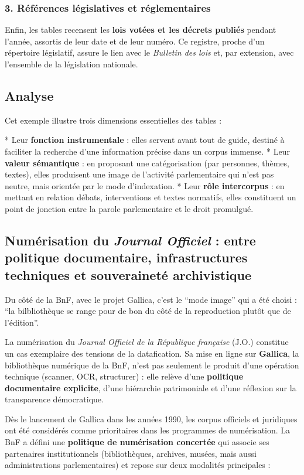 \subsubsection{3. Références législatives et réglementaires}

Enfin, les tables recensent les \textbf{lois votées et les décrets publiés} pendant l’année, assortis de leur date et de leur numéro. Ce registre, proche d’un répertoire législatif, assure le lien avec le \emph{Bulletin des lois} et, par extension, avec l’ensemble de la législation nationale.

\subsection{Analyse}

Cet exemple illustre trois dimensions essentielles des tables :

* Leur \textbf{fonction instrumentale} : elles servent avant tout de guide, destiné à faciliter la recherche d’une information précise dans un corpus immense.
* Leur \textbf{valeur sémantique} : en proposant une catégorisation (par personnes, thèmes, textes), elles produisent une image de l’activité parlementaire qui n’est pas neutre, mais orientée par le mode d’indexation.
* Leur \textbf{rôle intercorpus} : en mettant en relation débats, interventions et textes normatifs, elles constituent un point de jonction entre la parole parlementaire et le droit promulgué.

\subsection{Numérisation du \emph{Journal Officiel} : entre politique documentaire, infrastructures techniques et souveraineté archivistique}

Du côté de la BnF, avec le projet Gallica, c'est le \enquote{mode image} qui a été choisi : \enquote{la bilbliothèque se range pour de bon du côté de la reproduction plutôt que de l'édition}.

La numérisation du \emph{Journal Officiel de la République française} (J.O.) constitue un cas exemplaire des tensions de la datafication. Sa mise en ligne sur \textbf{Gallica}, la bibliothèque numérique de la BnF, n’est pas seulement le produit d’une opération technique (scanner, OCR, structurer) : elle relève d’une \textbf{politique documentaire explicite}, d’une hiérarchie patrimoniale et d’une réflexion sur la transparence démocratique.

Dès le lancement de Gallica dans les années 1990, les corpus officiels et juridiques ont été considérés comme prioritaires dans les programmes de numérisation. La BnF a défini une \textbf{politique de numérisation concertée} qui associe ses partenaires institutionnels (bibliothèques, archives, musées, mais aussi administrations parlementaires) et repose sur deux modalités principales :

